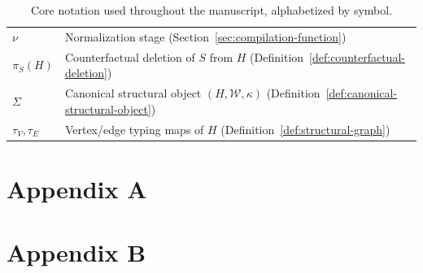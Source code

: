 \documentclass[11pt]{article}
\begin{document}
\begin{table}[h]
\begin{tabular}{@{}ll@{}}
$\nu$ & Normalization stage (Section~\ref{sec:compilation-function}) \\
$\pi_S(H)$ & Counterfactual deletion of $S$ from $H$ (Definition~\ref{def:counterfactual-deletion}) \\
$\Sigma$ & Canonical structural object $(H,\mathcal W,\kappa)$ (Definition~\ref{def:canonical-structural-object}) \\
$\tau_V,\tau_E$ & Vertex/edge typing maps of $H$ (Definition~\ref{def:structural-graph}) \\
\bottomrule
\end{tabular}
\caption{Core notation used throughout the manuscript, alphabetized by symbol.}
\end{table}

\section{Appendix A}
\label{app:a}

\section{Appendix B}
\label{app:b}



\end{document}
